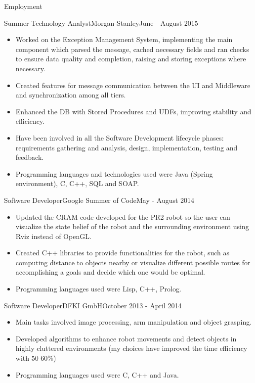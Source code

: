 \documentclass[]{cv}
\begin{document}
\begin{cvsection}{Employment}
		\begin{cvsubsection}{Summer Technology Analyst}{Morgan Stanley}{June - August 2015}
			\begin{itemize}
				\item Worked on the Exception Management System, implementing the main component which parsed the message, cached necessary fields and ran checks to ensure 
					data quality and completion, raising and storing exceptions where necessary.
				\item Created features for message communication between the UI and Middleware and synchronization among all tiers.	
				\item Enhanced the DB with Stored Procedures and UDFs, improving stability and efficiency.
				\item Have been involved in all the Software Development lifecycle phases: requirements gathering and analysis, design,
					implementation, testing and feedback.
				\item Programming languages and technologies used were Java (Spring environment), C, C++, SQL and SOAP.
			\end{itemize}
		\end{cvsubsection}

		\begin{cvsubsection}{Software Developer}{Google Summer of Code}{May - August 2014}
			\begin{itemize}
				\item Updated the CRAM code developed for the PR2 robot so the user can visualize the state belief of the 
				robot and the surrounding environment using Rviz instead of OpenGL.
				\item Created C++ libraries to provide functionalities for the robot, such as computing distance to objects 
				nearby or visualize different possible routes for accomplishing a goals and decide which one would be optimal.
				\item Programming languages used were Lisp, C++, Prolog.
			\end{itemize}
		\end{cvsubsection}

		\begin{cvsubsection}{Software Developer}{DFKI GmbH}{October 2013 - April 2014}
			\begin{itemize}
				\item Main tasks involved image processing, arm manipulation and object grasping.
				\item Developed algorithms to enhance robot movements and detect objects in highly cluttered environments (my
				choices have improved the time efficiency with 50-60\%)
				\item Programming languages used were C, C++ and Java.
			\end{itemize}
		\end{cvsubsection}

	\end{cvsection}
	
\end{document}
